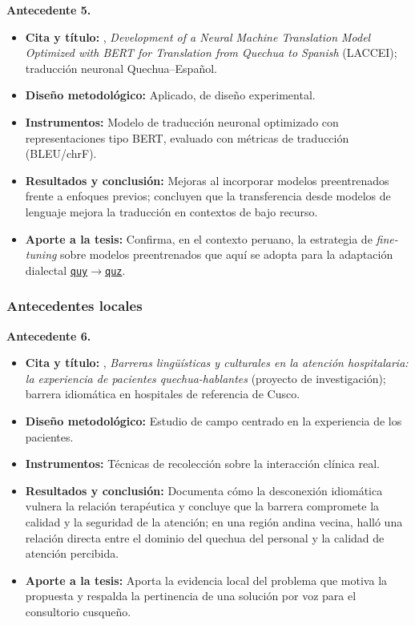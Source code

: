 \documentclass[12pt,a4paper]{article}
\newenvironment{bloqueObsDos}{\par\color{verdeOK}}{\par}
\DeclareRobustCommand{\sig}[1]{\hyperlink{sig:#1}{\texttt{#1}}}
\begin{document}
\begin{bloqueObsDos}
\noindent\textbf{Antecedente 5.}
\begin{itemize}\setlength{\itemsep}{1pt}
  \item \textbf{Cita y t{\'i}tulo:} \textcite{CuevaMedina2024}, \emph{Development of a Neural Machine Translation Model Optimized with BERT for Translation from Quechua to Spanish} (LACCEI); traducci{\'o}n neuronal Quechua--Espa{\~n}ol.
  \item \textbf{Dise{\~n}o metodol{\'o}gico:} Aplicado, de dise{\~n}o experimental.
  \item \textbf{Instrumentos:} Modelo de traducci{\'o}n neuronal optimizado con representaciones tipo BERT, evaluado con m{\'e}tricas de traducci{\'o}n (BLEU/chrF).
  \item \textbf{Resultados y conclusi{\'o}n:} Mejoras al incorporar modelos preentrenados frente a enfoques previos; concluyen que la transferencia desde modelos de lenguaje mejora la traducci{\'o}n en contextos de bajo recurso.
  \item \textbf{Aporte a la tesis:} Confirma, en el contexto peruano, la estrategia de \emph{fine-tuning} sobre modelos preentrenados que aqu{\'i} se adopta para la adaptaci{\'o}n dialectal \sig{quy}$\to$\sig{quz}.
\end{itemize}
\end{bloqueObsDos}

\subsubsection{Antecedentes locales}
\begin{bloqueObsDos}
\noindent\textbf{Antecedente 6.}
\begin{itemize}\setlength{\itemsep}{1pt}
  \item \textbf{Cita y t{\'i}tulo:} \textcite{begazo2026}, \emph{Barreras ling{\"u}{\'i}sticas y culturales en la atenci{\'o}n hospitalaria: la experiencia de pacientes quechua-hablantes} (proyecto de investigaci{\'o}n); barrera idiom{\'a}tica en hospitales de referencia de Cusco.
  \item \textbf{Dise{\~n}o metodol{\'o}gico:} Estudio de campo centrado en la experiencia de los pacientes.
  \item \textbf{Instrumentos:} T{\'e}cnicas de recolecci{\'o}n sobre la interacci{\'o}n cl{\'i}nica real.
  \item \textbf{Resultados y conclusi{\'o}n:} Documenta c{\'o}mo la desconexi{\'o}n idiom{\'a}tica vulnera la relaci{\'o}n terap{\'e}utica y concluye que la barrera compromete la calidad y la seguridad de la atenci{\'o}n; en una regi{\'o}n andina vecina, \textcite{cuaila2022} hall{\'o} una relaci{\'o}n directa entre el dominio del quechua del personal y la calidad de atenci{\'o}n percibida.
  \item \textbf{Aporte a la tesis:} Aporta la evidencia local del problema que motiva la propuesta y respalda la pertinencia de una soluci{\'o}n por voz para el consultorio cusque{\~n}o.
\end{itemize}
\end{bloqueObsDos}
\end{document}
